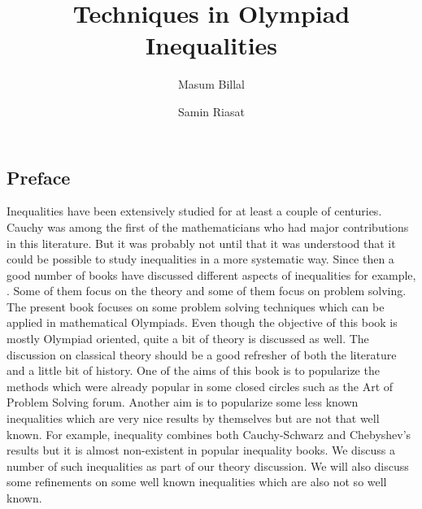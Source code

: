 \documentclass[a4paper, 12pt, leqno,]{book}
\title{\bfseries Techniques in Olympiad Inequalities}
\author{Masum Billal\and Samin Riasat}
\theoremstyle{definition}
\numberwithin{problem}{chapter}
\begin{document}
	\frontmatter
	\maketitle
	\begin{refsection}
		\section*{Preface}
		Inequalities have been extensively studied for at least a couple of centuries. Cauchy was among the first of the mathematicians who had major contributions in this literature. But it was probably not until \textcite{hardy_littlewood_poolya_2018} that it was understood that it could be possible to study inequalities in a more systematic way. Since then a good number of books have discussed different aspects of inequalities for example, \textcite{beckenbach_bellman_1983}. Some of them focus on the theory and some of them focus on problem solving. The present book focuses on some problem solving techniques which can be applied in mathematical Olympiads. Even though the objective of this book is mostly Olympiad oriented, quite a bit of theory is discussed as well. The discussion on classical theory should be a good refresher of both the literature and a little bit of history. One of the aims of this book is to popularize the methods which were already popular in some closed circles such as the Art of Problem Solving forum. Another aim is to popularize some less known inequalities which are very nice results by themselves but are not that well known. For example, \textcite{Seitz1936} inequality combines both Cauchy-Schwarz and Chebyshev's results but it is almost non-existent in popular inequality books. We discuss a number of such inequalities as part of our theory discussion. We will also discuss some refinements on some well known inequalities which are also not so well known.
		
		\printbibliography
	\end{refsection}
	\tableofcontents
	\mainmatter

	\begin{refsection}
		
		
		
		
		
		
		\printbibliography
	\end{refsection}
	
	\begin{refsection}
		
	\end{refsection}
\end{document}
